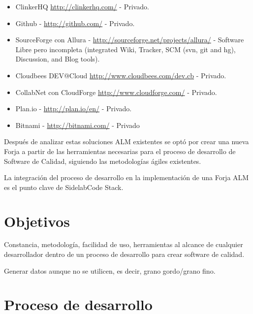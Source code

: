 \documentclass[11pt]{scrartcl}
\begin{document}
\begin{itemize}
	\item ClinkerHQ \url{http://clinkerhq.com/} - Privado.
	\item Github - \url{http://github.com/} - Privado.
	\item SourceForge con Allura - \url{http://sourceforge.net/projects/allura/} - Software Libre pero incompleta (integrated Wiki, Tracker, SCM (svn, git and hg), Discussion, and Blog tools).
	\item Cloudbees DEV@Cloud \url{http://www.cloudbees.com/dev.cb} - Privado.
	\item CollabNet con CloudForge \url{http://www.cloudforge.com/} - Privado.
	\item Plan.io - \url{http://plan.io/en/} - Privado.
	\item Bitnami - \url{http://bitnami.com/} - Privado
\end{itemize}

\par Después de analizar estas soluciones ALM existentes se optó por crear una nueva Forja a partir de las herramientas necesarias para el proceso de desarrollo de Software de Calidad, siguiendo las metodologías ágiles existentes.

\par La integración del proceso de desarrollo en la implementación de una Forja ALM es el punto clave de SidelabCode Stack.


\section{Objetivos}
\label{sec:objetivos}

\par Constancia, metodolog\'ia, facilidad de uso, herramientas al alcance de cualquier desarrollador dentro de un proceso de desarrollo para crear software de calidad.

\par Generar datos aunque no se utilicen, es decir, grano gordo/grano fino.

\par 


\section{Proceso de desarrollo}
\label{sec:procesodesarrollo}
\end{document}
